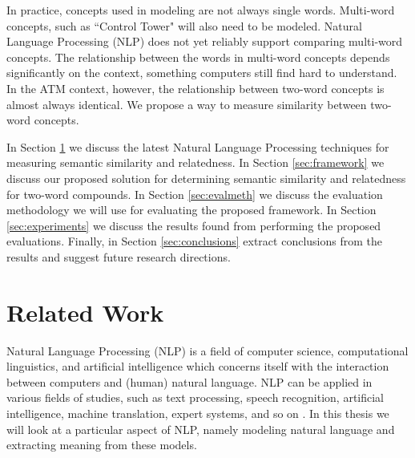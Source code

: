 \documentclass{article}
\begin{document}
In practice, concepts used in modeling are not always single words. Multi-word concepts, such as ``Control Tower" will also need to be modeled. Natural Language Processing (NLP) does not yet reliably support comparing multi-word concepts. The relationship between the words in multi-word concepts depends significantly on the context, something computers still find hard to understand. In the ATM context, however, the relationship between two-word concepts is almost always identical. We propose a way to measure similarity between two-word concepts.

In Section \ref{sec:relwork} we discuss the latest Natural Language Processing techniques for measuring semantic similarity and relatedness. In Section \ref{sec:framework} we discuss our proposed solution for determining semantic similarity and relatedness for two-word compounds. In Section \ref{sec:evalmeth} we discuss the evaluation methodology we will use for evaluating the proposed framework. In Section \ref{sec:experiments} we discuss the results found from performing the proposed evaluations. Finally, in Section \ref{sec:conclusions} extract conclusions from the results and suggest future research directions.



\section{Related Work} \label{sec:relwork}

Natural Language Processing (NLP) is a field of computer science, computational linguistics, and artificial intelligence which concerns itself with the interaction between computers and (human) natural language. NLP can be applied in various fields of studies, such as text processing, speech recognition, artificial intelligence, machine translation, expert systems, and so on \citep{chowdhury2003natural}. In this thesis we will look at a particular aspect of NLP, namely modeling natural language and extracting meaning from these models.
\end{document}
